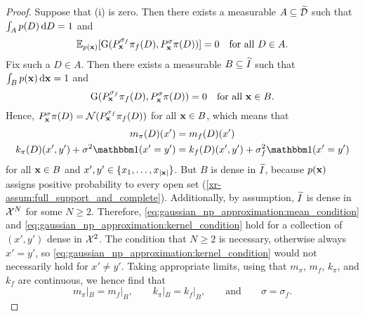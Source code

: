 \documentclass[12pt, twoside]{report}
\newcommand{\xrprefix}[1]{xr-#1}
\begin{document}
\begin{proof}
    Suppose that (i) is zero.
    Then there exists a measurable $A \subseteq \widetilde{\mathcal{D}}$ such that $\int_A p(D) \, \mathrm{d} D = 1$ and
    \begin{equation}
        \mathbb{E}_{p(\mathbf{x})}[\text{G}(P^{\sigma_f}_{\mathbf{x}} \pi_f(D), P^{\sigma}_{\mathbf{x}} \pi(D))] = 0
        \quad \text{for all $D \in A$}.
    \end{equation}
    Fix such a $D \in A$.
    Then there exists a measurable $B \subseteq \widetilde{I}$ such that $\int_{B} p(\mathbf{x}) \, \mathrm{d} \mathbf{x} = 1$ and%
    \begin{equation}
        \text{G}(P^{\sigma_f}_{\mathbf{x}} \pi_f(D), P^{\sigma}_{\mathbf{x}} \pi(D)) = 0
        \quad \text{for all $\mathbf{x} \in B$}.
    \end{equation}
    Hence, %
    $
        P^{\sigma}_{\mathbf{x}} \pi(D)
        = \mathcal{N}(P^{\sigma_f}_{\mathbf{x}} \pi_f(D))
    $ for all $\mathbf{x} \in B$, which means that
    \begin{align}
        \label{eq:gaussian_np_approximation:mean_condition}
        m_\pi(D)(x') &= m_f(D)(x') \\
        \label{eq:gaussian_np_approximation:kernel_condition}
        k_\pi(D)(x', y') + \sigma^2 \ind(x' = y') &= k_f(D)(x', y') + \sigma^2_f \ind(x' = y')
    \end{align}
    for all $\mathbf{x} \in B$ and $x', y' \in \{x_1, \ldots, x_{\lvert\mathbf{x}\rvert}\}$.
    But $B$ is dense in $\widetilde{I}$, because $p(\mathbf{x})$ assigns positive probability to every open set (\cref{\xrprefix{assum:full_support_and_complete}}). 
    Additionally, by assumption, $\widetilde{I}$ is dense in $\mathcal{X}^N$ for some $N \ge 2$.
    Therefore, \eqref{eq:gaussian_np_approximation:mean_condition} and \eqref{eq:gaussian_np_approximation:kernel_condition} hold for a collection of $(x',y')$ dense in $\mathcal{X}^2$.
    The condition that $N \ge 2$ is necessary, otherwise always $x' = y'$, so \eqref{eq:gaussian_np_approximation:kernel_condition} would not necessarily hold for $x' \neq y'$.
    Taking appropriate limits, using that $m_\pi$, $m_f$, $k_\pi$, and $k_f$ are continuous, we hence find that
    \begin{equation}
        m_\pi|_{B} = m_f|_{B},
        \qquad
        k_\pi|_{B} = k_f|_{B},
        \qquad
        \text{and}
        \qquad
        \sigma = \sigma_f.
    \end{equation}

\end{proof}
\end{document}
